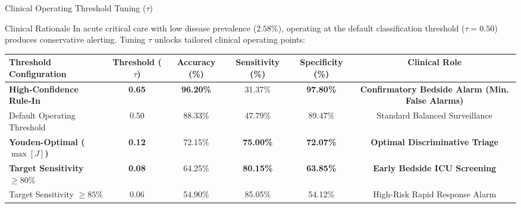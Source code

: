 \documentclass[aspectratio=169, 10pt]{beamer}
\begin{document}
\begin{frame}{Clinical Operating Threshold Tuning ($\tau$)}
    \begin{block}{Clinical Rationale}
        \scriptsize
        In acute critical care with low disease prevalence ($2.58\%$), operating at the default classification threshold ($\tau=0.50$) produces conservative alerting. Tuning $\tau$ unlocks tailored clinical operating points:
    \end{block}
    
    \begin{table}
        \centering
        \small
        \renewcommand{\arraystretch}{1.2}
        \begin{tabular}{lccccc}
            \toprule
            \textbf{Threshold Configuration} & \textbf{Threshold ($\tau$)} & \textbf{Accuracy (\%)} & \textbf{Sensitivity (\%)} & \textbf{Specificity (\%)} & \textbf{Clinical Role} \\
            \midrule
            \textbf{High-Confidence Rule-In} & \textbf{0.65} & \textbf{96.20\%} & 31.37\% & \textbf{97.80\%} & \textbf{Confirmatory Bedside Alarm (Min. False Alarms)} \\
            Default Operating Threshold & 0.50 & 88.33\% & 47.79\% & 89.47\% & Standard Balanced Surveillance \\
            \textbf{Youden-Optimal ($\max [J]$)} & \textbf{0.12} & 72.15\% & \textbf{75.00\%} & \textbf{72.07\%} & \textbf{Optimal Discriminative Triage} \\
            \textbf{Target Sensitivity $\ge 80\%$} & \textbf{0.08} & 64.25\% & \textbf{80.15\%} & \textbf{63.85\%} & \textbf{Early Bedside ICU Screening} \\
            Target Sensitivity $\ge 85\%$ & 0.06 & 54.90\% & 85.05\% & 54.12\% & High-Risk Rapid Response Alarm \\
            \bottomrule
        \end{tabular}
    \end{table}


\end{frame}
\end{document}
